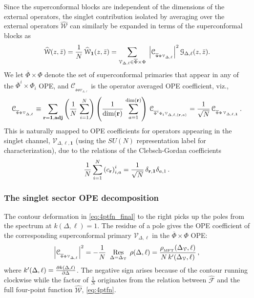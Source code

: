\documentclass[11pt]{article}
\newcommand{\zb}{\bar{z}}
\newcommand{\Phib}{\overline{\Phi}}
\newcommand{\cope}[1]{\mathcal{C}_{_{#1}}}
\newcommand{\mft}{\text{\tiny MFT}}
\begin{document}
Since the superconformal blocks are independent of the dimensions of the external operators, the singlet contribution isolated by averaging over the external operators $\widehat{\mathcal{W}}$ can similarly be expanded in terms of the superconformal blocks as
%
\begin{equation}\label{eq:4ptfn_sconfblocks}
\widehat{\mathcal{W}}(z,\zb) =  \frac{1}{N}\, \widehat{\mathcal{W}}_\mathbf{1}(z,\zb)= \sum_{\mathcal{V}_{\Delta,\ell} \in \Phib \times \Phi}\;
   \abs{\cope{\Phib\Phi\mathcal{V}_{\Delta,\ell} } }^{2}\,\mathcal{G}_{\Delta,\ell}(z,\zb).
\end{equation}
%
We let $\Phib \times \Phi$ denote the set of superconformal primaries that appear in any of the $\Phib^i \times \Phi_i$ OPE, and  $\cope{\Phib\Phi\mathcal{V}_{\Delta,\ell} }$ is the operator averaged OPE coefficient, viz., 
%
\begin{equation}\label{eq:opeav}
\cope{\Phib\Phi\mathcal{V}_{\Delta,\ell}}  \equiv \sum_{{\bf r}={\bf 1},{\bf adj}} 
\left(\frac{1}{N} \, \sum_{i=1}^N\right)\left(\frac{1}{{\rm dim}({\bf r})} \, \sum_{a=1}^{{\rm dim}({\bf r})}\right)\, \cope{\Phib^i\Phi_i\mathcal{V}_{\Delta,\ell,({\bf r},a)}}= \frac{1}{\sqrt{N}} \, \cope{\Phib \Phi \,\mathcal{V}_{\Delta,\ell, \mathbf{1}} }\,.
\end{equation}  
%
This is naturally mapped to OPE coefficients for operators appearing in the singlet channel, $\mathcal{V}_{\Delta,\ell, \mathbf{1}}$ (using the $SU(N)$ representation label for characterization), due to the relations of the Clebsch-Gordan coefficients
%
\begin{equation}
\frac{1}{N}\sum_{i=1}^N \left(c_{\bf r}\right)^i_{i,a} = \frac{1}{\sqrt{N}} \, \delta_{{\bf r},{\bf 1}}\delta_{a,1}\,.
\end{equation}  
%

\subsubsection{The singlet sector OPE decomposition} 

The contour deformation in \eqref{eq:4ptfn_final} to the right picks up the poles from the spectrum at $k(\Delta,\ell) =1$. The residue of a pole gives the OPE coefficient of the corresponding superconformal primary $\mathcal{V}_{\Delta,\ell}$ in the $\Phib \times \Phi$ OPE:
%
\begin{equation}\label{eqn:OPEcoeffs}
\abs{\cope{\Phib\Phi\mathcal{V}_{\Delta,\ell}}}^{2} 
  = 
    -\frac{1}{N}\; \underset{\Delta=\Delta_{\mathcal{V}}}{\Res}\,\rho(\Delta,\ell) = \frac{\rho_{ _\mft} (\Delta_{\mathcal{V}},\ell)} {N \,k'(\Delta_{\mathcal{V}},\ell)} \,,
\end{equation}
%
where $k'(\Delta,\ell)= \pdv{k(\Delta,\ell)}{\Delta}$.
The negative sign arises because of the contour running clockwise while the factor of $\frac{1}{N}$ originates from the relation between $\widehat{\mathcal{F}}$ and the full four-point function $\widehat{\mathcal{W}}$, \eqref{eq:4ptfn}.
\end{document}
